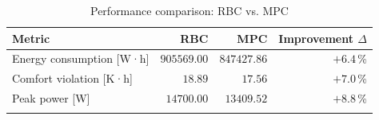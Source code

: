 
    \begin{table}[htbp]
    \centering
    \caption{Performance comparison: RBC vs. MPC}
    \label{tab:controller_performance}
    \begin{tabular}{lrrr}
    \toprule
    \textbf{Metric} & \textbf{RBC} & \textbf{MPC} & \textbf{Improvement $\Delta$} \\
    \midrule
      Energy consumption [W·h] & $905569.00$ & $847427.86$ & $+6.4\,$\% \\
  Comfort violation [K·h] & $18.89$ & $17.56$ & $+7.0\,$\% \\
  Peak power [W] & $14700.00$ & $13409.52$ & $+8.8\,$\% \\
    \\
    \bottomrule
    \end{tabular}
    \end{table}
    